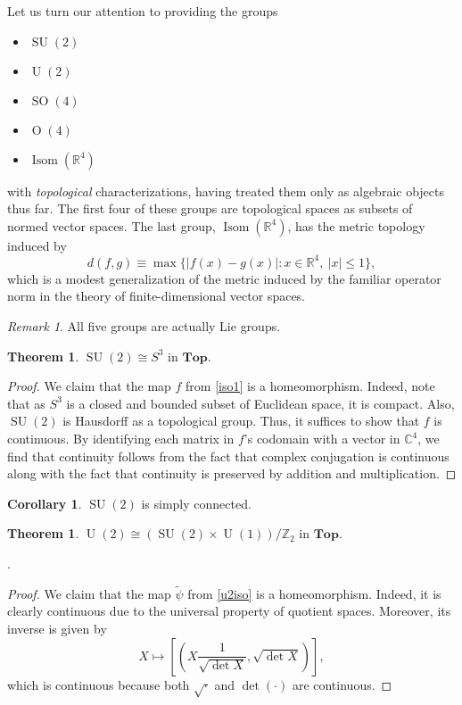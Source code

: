 \documentclass[10pt,letterpaper,cm]{nupset}
\theoremstyle{definition}
\theoremstyle{theorem}
\newtheorem{theorem}[definition]{Theorem}
\newtheorem{cor}[definition]{Corollary}
\theoremstyle{remark}
\newtheorem{remark}[definition]{Remark}
\newcommand{\C}{\mathbb C}
\newcommand{\R}{\mathbb R}
\newcommand{\Z}{\mathbb Z}
\newcommand{\1}{\mathbf{1}}
\newcommand{\0}{\vec {0}}
\DeclareMathOperator{\ORT}{O}
\DeclareMathOperator{\Isom}{Isom}
\DeclareMathOperator{\SO}{SO}
\DeclareMathOperator{\SU}{SU}
\DeclareMathOperator{\U}{U}
\begin{document}
Let us turn our attention to providing the groups
\begin{itemize}
\item $\SU(2)$
\item $\U(2)$
\item $\SO(4)$
\item $\ORT(4)$
\item $\Isom(\R^4)$
\end{itemize}
with \emph{topological} characterizations, having treated them only as algebraic objects thus far. The first four of these groups are topological spaces as subsets of normed vector spaces. The last group, $\Isom(\R^4)$, has the metric topology induced by
\[
d(f,g) \equiv \max\{ \left\lvert{f(x)-g(x)}\right\rvert : x \in \R^4,\ \left\lvert{x}\right\rvert \leq 1\},
\]  which is a modest generalization of the metric induced by the familiar operator norm in the theory of finite-dimensional vector spaces.
\begin{remark}
All five groups are actually Lie groups.
\end{remark}

\smallskip

\begin{theorem}
$\SU(2) \cong S^3$ in $\mathbf{Top}$. 
\end{theorem}

\begin{proof}
We claim that the map $f$ from \cref{iso1} is a homeomorphism. Indeed, note that as $S^3$ is a closed and bounded subset of Euclidean space, it is compact. Also, $\SU(2)$ is Hausdorff as a topological group. Thus, it suffices to show that $f$ is continuous. By identifying each matrix in $f$'s codomain with a vector in $\C^4$, we find that continuity follows from the fact that complex conjugation is continuous along with the fact that continuity is preserved by addition and multiplication. 
\end{proof}

\begin{cor}
$\SU(2)$ is simply connected.
\end{cor}

\medskip

\begin{theorem}
 $\U(2)\cong \left(\SU(2)\times \U(1)\right)/\Z_2$ in $\mathbf{Top}$.
\end{theorem}.
\begin{proof}
We claim that the map $\tilde{\psi}$ from \cref{u2iso} is a homeomorphism. Indeed, it is clearly continuous due to the universal property of quotient spaces. Moreover, its inverse is given by 
\[
X\mapsto \left[\left(X\frac{1}{\sqrt{\det{X}}}, \sqrt{\det{X}}\right)\right]
,\] which is continuous because both $\sqrt{\cdot}$ and $\det(\cdot)$ are continuous.
\end{proof}
\end{document}

